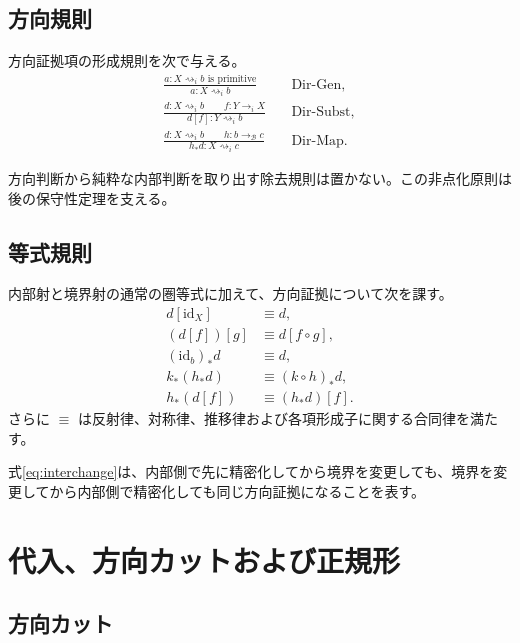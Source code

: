 \documentclass[a4paper,11pt]{ltjsarticle}
\theoremstyle{definition}
\theoremstyle{plain}
\newcommand{\Bdy}{\mathcal B}
\newcommand{\DEq}{\equiv}
\begin{document}
\subsection{方向規則}

方向証拠項の形成規則を次で与える。
\begin{align}
\frac{a:X\rightsquigarrow_i b\text{ is primitive}}
     {a:X\rightsquigarrow_i b}
&\quad\mathrm{Dir\mbox{-}Gen},
\label{rule:syn-dir-gen}\\[0.8em]
\frac{d:X\rightsquigarrow_i b\qquad f:Y\to_iX}
     {d[f]:Y\rightsquigarrow_i b}
&\quad\mathrm{Dir\mbox{-}Subst},
\label{rule:syn-dir-subst}\\[0.8em]
\frac{d:X\rightsquigarrow_i b\qquad h:b\to_{\Bdy}c}
     {h_*d:X\rightsquigarrow_i c}
&\quad\mathrm{Dir\mbox{-}Map}.
\label{rule:syn-dir-map}
\end{align}

方向判断から純粋な内部判断を取り出す除去規則は置かない。この非点化原則は後の保守性定理を支える。

\subsection{等式規則}

内部射と境界射の通常の圏等式に加えて、方向証拠について次を課す。
\begin{align}
 d[\mathrm{id}_X]&\DEq d,
 \label{eq:dir-id}\\
 (d[f])[g]&\DEq d[f\circ g],
 \label{eq:dir-assoc}\\
 (\mathrm{id}_b)_*d&\DEq d,
 \label{eq:bdy-id}\\
 k_*(h_*d)&\DEq(k\circ h)_*d,
 \label{eq:bdy-assoc}\\
 h_*(d[f])&\DEq(h_*d)[f].
 \label{eq:interchange}
\end{align}
さらに $\DEq$ は反射律、対称律、推移律および各項形成子に関する合同律を満たす。

式\eqref{eq:interchange}は、内部側で先に精密化してから境界を変更しても、境界を変更してから内部側で精密化しても同じ方向証拠になることを表す。

\section{代入、方向カットおよび正規形}

\subsection{方向カット}
\end{document}
